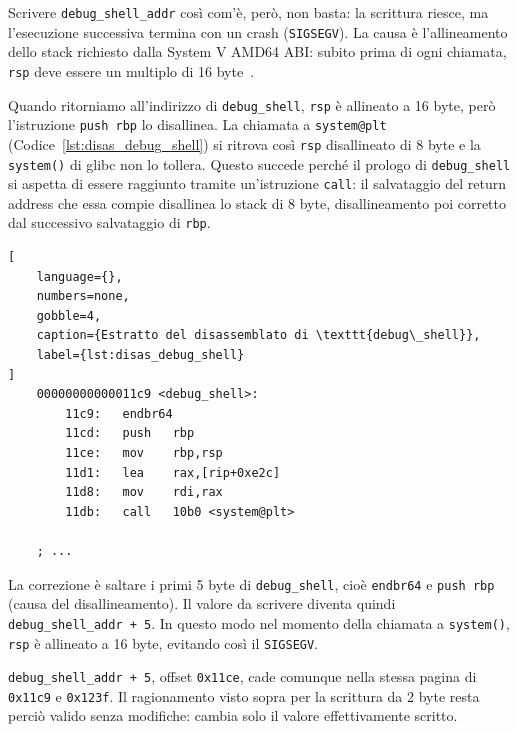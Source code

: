 Scrivere \texttt{debug\_shell\_addr} così com'è, però, non basta: la scrittura riesce, ma l'esecuzione successiva termina con un crash (\texttt{SIGSEGV}).
La causa è l'allineamento dello stack richiesto dalla System V AMD64 ABI: subito prima di ogni chiamata, \texttt{rsp} deve essere un multiplo di 16 byte~\cite{psabi2025}.

Quando ritorniamo all'indirizzo di \texttt{debug\_shell}, \texttt{rsp} è allineato a 16 byte, però l'istruzione \texttt{push rbp} lo disallinea. La chiamata a \texttt{system@plt} (Codice~\ref{lst:disas_debug_shell}) si ritrova così \texttt{rsp} disallineato di 8 byte e la \texttt{system()} di glibc non lo tollera.
Questo succede perché il prologo di \texttt{debug\_shell} si aspetta di essere raggiunto tramite un'istruzione \texttt{call}: il salvataggio del return address che essa compie disallinea lo stack di 8 byte, disallineamento poi corretto dal successivo salvataggio di \texttt{rbp}.
\begin{lstlisting}[
    language={},
    numbers=none,
    gobble=4,
    caption={Estratto del disassemblato di \texttt{debug\_shell}},
    label={lst:disas_debug_shell}
]
    00000000000011c9 <debug_shell>:
        11c9:	endbr64
        11cd:	push   rbp
        11ce:	mov    rbp,rsp
        11d1:	lea    rax,[rip+0xe2c]
        11d8:	mov    rdi,rax
        11db:	call   10b0 <system@plt>
        
    ; ...
\end{lstlisting}

La correzione è saltare i primi 5 byte di \texttt{debug\_shell}, cioè \texttt{endbr64} e \texttt{push rbp} (causa del disallineamento). Il valore da scrivere diventa quindi \texttt{debug\_shell\_addr + 5}. In questo modo nel momento della chiamata a \texttt{system()}, \texttt{rsp} è allineato a 16 byte, evitando così il \texttt{SIGSEGV}.

\texttt{debug\_shell\_addr + 5}, offset \texttt{0x11ce}, cade comunque nella stessa pagina di \texttt{0x11c9} e \texttt{0x123f}. Il ragionamento visto sopra per la scrittura da 2 byte resta perciò valido senza modifiche: cambia solo il valore effettivamente scritto.


